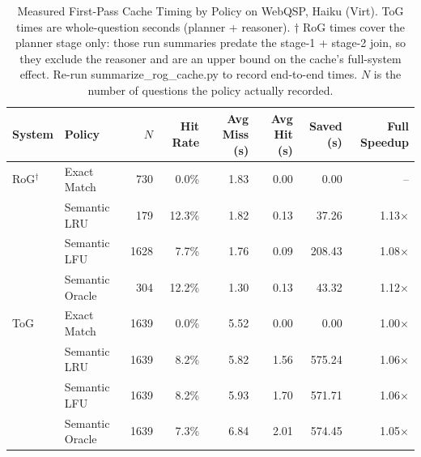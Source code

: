 \begin{table}[htbp]
\centering
\caption{Measured First-Pass Cache Timing by Policy on WebQSP, Haiku (Virt). ToG times are whole-question seconds (planner + reasoner). $\dagger$ RoG times cover the planner stage only: those run summaries predate the stage-1 + stage-2 join, so they exclude the reasoner and are an upper bound on the cache's full-system effect. Re-run summarize\_rog\_cache.py to record end-to-end times. $N$ is the number of questions the policy actually recorded.}
\label{tab:live_cache_timing_webqsp_haiku_virt}
\begin{tabular}{llrrrrrr}
\hline
\textbf{System} & \textbf{Policy} & \textbf{$N$} & \textbf{Hit Rate} & \textbf{Avg Miss (s)} & \textbf{Avg Hit (s)} & \textbf{Saved (s)} & \textbf{Full Speedup} \\
\hline
RoG$^{\dagger}$ & Exact Match      & 730 & 0.0\% & 1.83 & 0.00 & 0.00 & -- \\
     & Semantic LRU     & 179 & 12.3\% & 1.82 & 0.13 & 37.26 & 1.13$\times$ \\
     & Semantic LFU     & 1628 & 7.7\% & 1.76 & 0.09 & 208.43 & 1.08$\times$ \\
     & Semantic Oracle  & 304 & 12.2\% & 1.30 & 0.13 & 43.32 & 1.12$\times$ \\
\hline
ToG  & Exact Match      & 1639 & 0.0\% & 5.52 & 0.00 & 0.00 & 1.00$\times$ \\
     & Semantic LRU     & 1639 & 8.2\% & 5.82 & 1.56 & 575.24 & 1.06$\times$ \\
     & Semantic LFU     & 1639 & 8.2\% & 5.93 & 1.70 & 571.71 & 1.06$\times$ \\
     & Semantic Oracle  & 1639 & 7.3\% & 6.84 & 2.01 & 574.45 & 1.05$\times$ \\
\hline
\end{tabular}
\end{table}

